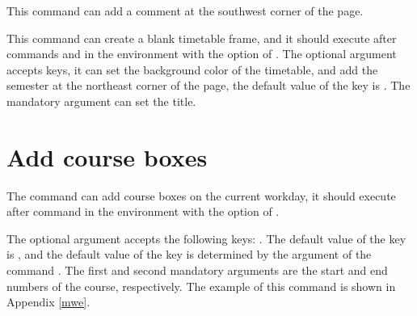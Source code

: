 \documentclass[letterpaper]{l3doc}
\begin{document}
\begin{function}{\more}
  \begin{syntax}
     
  \end{syntax}

  This command can add a comment at the southwest corner of the page.
\end{function}

\begin{function}{\maketable}
  \begin{syntax}
       
  \end{syntax}

  This command can create a blank timetable frame, and it should execute after commands  and  in the  environment with the option of . The optional argument accepts keys, it can set the background color of the timetable, and add the semester at the northeast corner of the page, the default value of the key  is . The mandatory argument can set the title.
\end{function}

\section{Add course boxes}

\begin{function}{\course}
  \begin{syntax}
         
  \end{syntax}
\end{function}

The  command can add course boxes on the current workday, it should execute after command  in the  environment with the option of .

The optional argument accepts the following keys:     . The default value of the key  is , and the default value of the key  is determined by the argument of the command . The first and second mandatory arguments are the start and end numbers of the course, respectively.  The example of this command is shown in Appendix \ref{mwe}.
\end{document}
